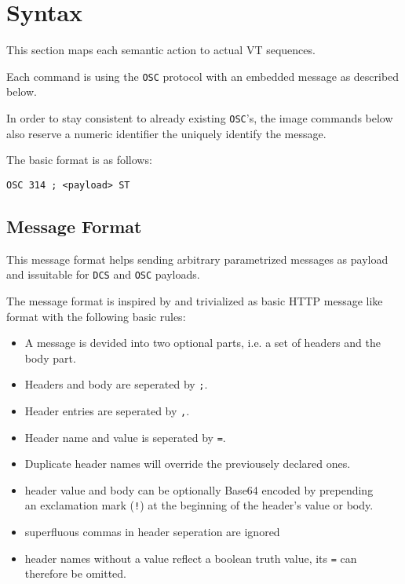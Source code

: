 \documentclass[a4paper]{article}
\newcommand{\code}[1]{\colorbox{light-gray}{\texttt{#1}}}
\begin{document}

\section{Syntax} %

This section maps each semantic action to actual VT sequences.

Each command is using the \code{OSC} protocol with an embedded message as
described below.

In order to stay consistent to already existing \code{OSC}'s,
the image commands below also reserve a numeric identifier the uniquely
identify the message.

The basic format is as follows:

\code{OSC 314 ; <payload> ST}


\subsection{Message Format} %

This message format helps sending arbitrary parametrized messages
as payload and issuitable for \code{DCS} and \code{OSC} payloads.

The message format is inspired by and trivialized as basic HTTP message like
format with the following basic rules:

\begin{itemize}
    \item A message is devided into two optional parts, i.e. a set of headers and the body part.
    \item Headers and body are seperated by \code{;}.
    \item Header entries are seperated by \code{,}.
    \item Header name and value is seperated by \code{=}.
    \item Duplicate header names will override the previousely declared ones.
    \item header value and body can be optionally Base64 encoded by prepending \\
        an exclamation mark (\code{!}) at the beginning of the header's value or body.
    \item superfluous commas in header seperation are ignored
    \item header names without a value reflect a boolean truth value,
        its \code{=} can therefore be omitted.
\end{itemize}
\end{document}
